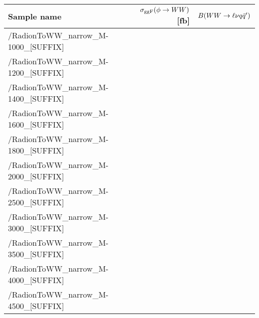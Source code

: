 \footnotesize
\begin{tabular}{lrr}
  \hline
  \textbf{Sample name} & $\sigma_{\mathrm{ggF}}(\phi\to WW)$ [fb] & $B(WW\to\ell\nu q\bar{q}')$ \\
  \hline
  \ttfamily/RadionToWW\_narrow\_M-1000\_[SUFFIX] &   \\
  \ttfamily/RadionToWW\_narrow\_M-1200\_[SUFFIX] &   \\
  \ttfamily/RadionToWW\_narrow\_M-1400\_[SUFFIX] &   \\
  \ttfamily/RadionToWW\_narrow\_M-1600\_[SUFFIX] &   \\
  \ttfamily/RadionToWW\_narrow\_M-1800\_[SUFFIX] &   \\
  \ttfamily/RadionToWW\_narrow\_M-2000\_[SUFFIX] &   \\
  \ttfamily/RadionToWW\_narrow\_M-2500\_[SUFFIX] &   \\
  \ttfamily/RadionToWW\_narrow\_M-3000\_[SUFFIX] &   \\
  \ttfamily/RadionToWW\_narrow\_M-3500\_[SUFFIX] &   \\
  \ttfamily/RadionToWW\_narrow\_M-4000\_[SUFFIX] &   \\
  \ttfamily/RadionToWW\_narrow\_M-4500\_[SUFFIX] &   \\
  \hline
\end{tabular}
